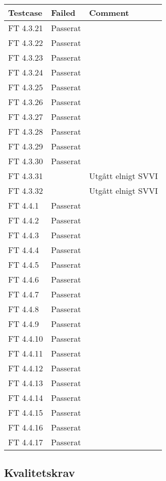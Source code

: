 \documentclass[a4paper]{article}
\begin{document}
\begin{tabular}{| l | l | p{11cm} |}
\hline
Testcase &  Failed & Comment\\
\hline
FT 4.3.21 & Passerat & \\
\hline
FT 4.3.22 & Passerat & \\
\hline
FT 4.3.23 & Passerat & \\
\hline
FT 4.3.24 & Passerat & \\
\hline
FT 4.3.25 & Passerat & \\
\hline
FT 4.3.26 & Passerat & \\
\hline
FT 4.3.27 & Passerat & \\
\hline
FT 4.3.28 & Passerat & \\
\hline
FT 4.3.29 & Passerat & \\
\hline
FT 4.3.30 & Passerat & \\
\hline
FT 4.3.31 & & Utgått elnigt SVVI\\
\hline
FT 4.3.32 & & Utgått elnigt SVVI\\
\hline
FT 4.4.1 & Passerat & \\
\hline
FT 4.4.2 & Passerat & \\
\hline
FT 4.4.3 & Passerat & \\
\hline
FT 4.4.4 & Passerat & \\
\hline
FT 4.4.5 & Passerat & \\
\hline
FT 4.4.6 & Passerat & \\
\hline
FT 4.4.7 & Passerat & \\
\hline
FT 4.4.8 & Passerat & \\
\hline
FT 4.4.9 & Passerat & \\
\hline
FT 4.4.10 & Passerat & \\
\hline
FT 4.4.11 & Passerat & \\
\hline
FT 4.4.12 & Passerat & \\
\hline
FT 4.4.13 & Passerat & \\
\hline
FT 4.4.14 & Passerat & \\
\hline
FT 4.4.15 & Passerat & \\
\hline
FT 4.4.16 & Passerat & \\
\hline
FT 4.4.17 & Passerat & \\
\hline
\end{tabular}




\subsection{Kvalitetskrav}
\end{document}
